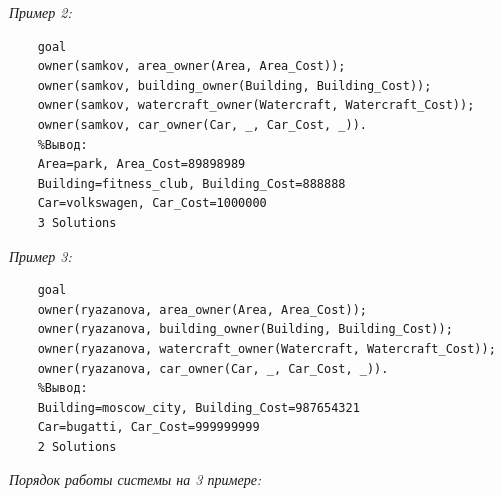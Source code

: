 \documentclass[a4paper,12pt]{article}
\begin{document}
	\textit{Пример 2:}
	
	\begin{verbatim}
	goal
	owner(samkov, area_owner(Area, Area_Cost));
	owner(samkov, building_owner(Building, Building_Cost));
	owner(samkov, watercraft_owner(Watercraft, Watercraft_Cost));
	owner(samkov, car_owner(Car, _, Car_Cost, _)).
	%Вывод:
	Area=park, Area_Cost=89898989
	Building=fitness_club, Building_Cost=888888
	Car=volkswagen, Car_Cost=1000000
	3 Solutions
	\end{verbatim}
	
	\textit{Пример 3:}
	
	\begin{verbatim}
	goal
	owner(ryazanova, area_owner(Area, Area_Cost));
	owner(ryazanova, building_owner(Building, Building_Cost));
	owner(ryazanova, watercraft_owner(Watercraft, Watercraft_Cost));
	owner(ryazanova, car_owner(Car, _, Car_Cost, _)).
	%Вывод:
	Building=moscow_city, Building_Cost=987654321
	Car=bugatti, Car_Cost=999999999
	2 Solutions
	\end{verbatim}
	
	\textit{Порядок работы системы на 3 примере:}
	
\end{document}
